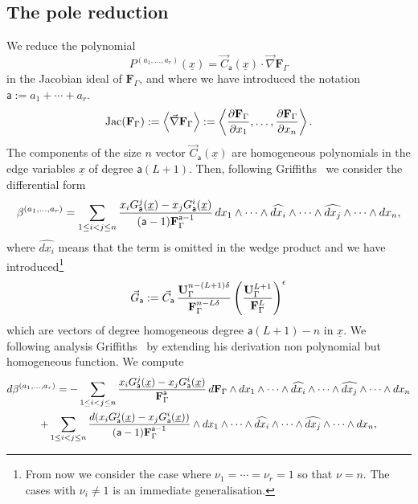 \documentclass[a4paper,12pt]{article}
\numberwithin{equation}{section}
\numberwithin{figure}{section}
\begin{document}
\subsection{The pole reduction}\label{sec:PoleRed}
 We reduce the polynomial
\begin{equation}\label{e:RedF}
 P^{(a_1,\dots,a_r)}(\underline x) = \vec C_{\mathsf{a}}(\underline x)\cdot
   \vec\nabla   \textbf{F}_\Gamma
 \end{equation}
 in the Jacobian ideal of $ \textbf{F}_\Gamma$, and
where we have introduced the notation $\mathsf{a}:=a_1+\cdots +a_r$. 
 \begin{equation}
   \textrm{Jac}(   \textbf{F}_\Gamma) :=\left\langle\vec\nabla  \textbf{F}_\Gamma \right\rangle :=\left\langle{\partial
       \textbf{F}_\Gamma\over\partial x_1},\dots,  {\partial
       \textbf{F}_\Gamma\over\partial x_n}\right\rangle.
 \end{equation}
The components of the size $n$ vector $ \vec C_{\mathsf{a}}(\underline x)$ are homogeneous polynomials in the
     edge variables $\underline x$ of degree
     $\mathsf{a}(L+1)$. 
%
   Then,  following Griffiths~\cite{Griffith1,Griffith2} we consider the differential form
   \begin{equation}\label{e:betadef}
  \beta^{(a_1,\dots,a_r)}=  \sum_{1\leq i<j\leq n} {x_i
    G_{\mathsf{a}}^j  (\underline x)-x_j
   G_{\mathsf{a}}^i(\underline x)\over
    (\mathsf{a}-1)\textbf{F}_\Gamma^{\mathsf{a}-1}}\, 
 dx_1\wedge \cdots \wedge \widehat{dx_i}\wedge \cdots \wedge\widehat{dx_j}\wedge
  \cdots \wedge dx_n ,
\end{equation}
where $\widehat{dx_i}$ means that the term is omitted in the wedge
product and
we have introduced\footnote{From now we consider the case where
  $\nu_1=\cdots=\nu_r=1$ so that $\nu=n$. The cases with $\nu_i\neq1$
  is an immediate generalisation.} 
\begin{equation}
  \label{e:Gdef}
\vec  G_{\mathsf{a}}:=   \vec C_{\mathsf{a}} \,
{\textbf{U}_\Gamma^{n-(L+1)\delta}\over
  \textbf{F}_\Gamma^{n-L\delta}} \left(\mathbf{U}_\Gamma^{L+1}\over \mathbf{F}_\Gamma^L\right)^\epsilon
\end{equation}
which are vectors of degree homogeneous degree $\mathsf{a}(L+1)-n$ in
$\underline x$. 
We following analysis Griffiths~\cite{Griffiths_1969} by extending his
derivation non polynomial but homogeneous function.
We compute
\begin{multline}
  d\beta^{(a_1,\dots,a_r)}=-  \sum_{1\leq i<j\leq n} {x_i
    G_{\mathsf{a}}^j  (\underline x)-x_j
   G_{\mathsf{a}}^i(\underline x)\over
   \textbf{F}_\Gamma^{\mathsf{a}}}\, d \textbf{F}_\Gamma\wedge
 dx_1\wedge \cdots \wedge \widehat{dx_i}\wedge \cdots \wedge\widehat{dx_j}\wedge
 \cdots \wedge dx_n \cr
+  \sum_{1\leq i<j\leq n} {d(x_i
    G_{\mathsf{a}}^j  (\underline x)-x_j
   G_{\mathsf{a}}^i(\underline x))\over
    (\mathsf{a}-1)\textbf{F}_\Gamma^{\mathsf{a}-1}}\wedge
 dx_1\wedge \cdots \wedge \widehat{dx_i}\wedge \cdots \wedge\widehat{dx_j}\wedge
  \cdots \wedge dx_n ,
\end{multline}
\end{document}
